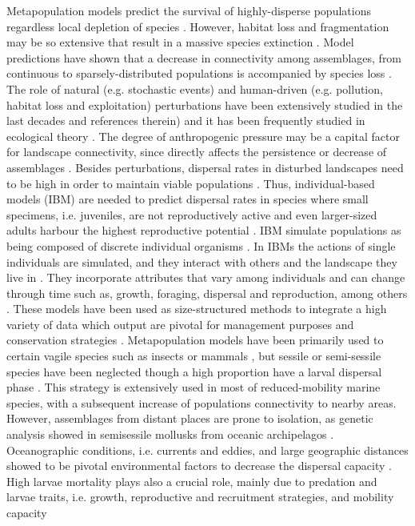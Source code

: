 \documentclass[12pt]{article}
\begin{document}
\begin{justify}
{{{{{Metapopulation models predict the survival of highly-disperse populations regardless local depletion of species \citep{hanski1999habitat,akccakaya2007role}. However, habitat loss and fragmentation may be so extensive that result in a massive species extinction \citep{montoya2008habitat,rybicki2013species,haddad2015habitat}. Model predictions have shown that a decrease in connectivity among assemblages, from continuous to sparsely-distributed populations is accompanied by species loss \citep{metzger2009time,niebuhr2015survival}. The role of natural (e.g. stochastic events) and human-driven (e.g. pollution, habitat loss and exploitation) perturbations have been extensively studied in the last decades \citep{dornelas2010disturbance} and references therein) and it has been frequently studied in ecological theory \citep{volkov2007patterns,gardner2008spatial}. The degree of anthropogenic pressure may be a capital factor for landscape connectivity, since directly affects the persistence or decrease of assemblages \citep{supp2014species}. Besides perturbations, dispersal rates in disturbed landscapes need to be high in order to maintain viable populations \citep{provan2008high}. Thus, individual-based models (IBM) are needed to predict dispersal rates in species where small specimens, i.e. juveniles, are not reproductively active and even larger-sized adults harbour the highest reproductive potential \citep{hendriks2008scaling,  werner2011reproductive}. IBM simulate populations as being composed of discrete individual organisms \citep{deangelis2014individual, Van2016predicting}. In IBMs the actions of single individuals are simulated, and they interact with others and the landscape they live in \citep{deangelis2005individual}. They incorporate attributes that vary among individuals and can change through time such as, growth, foraging, dispersal and reproduction, among others \citep{martin2013predicting,deangelis2014individual}. These models have been used as size-structured methods to integrate a high variety of data which output are pivotal for management purposes \citep{punt2013review} and conservation strategies \citep{nabe2014effects}. Metapopulation models have been primarily used to certain vagile species such as insects \citep{harrison1995testing, hilker2006parameterizing} or mammals \citep{krohne1997dynamics, lawes2000patch}, but sessile or semi-sessile species have been neglected though a high proportion have a larval dispersal phase \citep{sale2006merging, gaggiotti2017metapopulations}. This strategy is extensively used in most of reduced-mobility marine species, with a subsequent increase of populations connectivity to nearby areas. However, assemblages from distant places are prone to isolation, as genetic analysis showed in semisessile mollusks from oceanic archipelagos \citep{corte1996population, gaggiotti2017metapopulations, faria2017disentangling}. Oceanographic conditions, i.e. currents and eddies, and large geographic distances showed to be pivotal environmental factors to decrease the dispersal capacity \citep{palumbi1994genetic}. High larvae mortality plays also a crucial role, mainly due to predation and larvae traits, i.e. growth, reproductive and recruitment strategies, and mobility capacity \citep{cowen2000connectivity, cowen2009larval} }}}}}
\end{justify}
\end{document}
